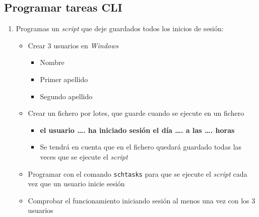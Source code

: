 \documentclass[11pt]{article}
\begin{document}
\subsection{Programar tareas CLI}
\label{sec:org68437ac}
\begin{enumerate}
\item Programas un \emph{script} que deje guardados todos los inicios de sesión:
\begin{itemize}
\item Crear 3 usuarios en \emph{Windows}
\begin{itemize}
\item Nombre
\item Primer apellido
\item Segundo apellido
\end{itemize}
\item Crear un fichero por lotes, que guarde cuando se ejecute en un fichero
\begin{itemize}
\item \textbf{el usuario \ldots{}. ha iniciado sesión el día \ldots{}. a las \ldots{}. horas}
\item Se tendrá en cuenta que en el fichero quedará guardado todas las veces que se ejecute el \emph{script}
\end{itemize}
\item Programar con el comando \texttt{schtasks} para que se ejecute el \emph{script} cada vez que un usuario inicie sesión
\item Comprobar el funcionamiento iniciando sesión al menos una vez con los 3 usuarios
\end{itemize}
\end{enumerate}
\end{document}
